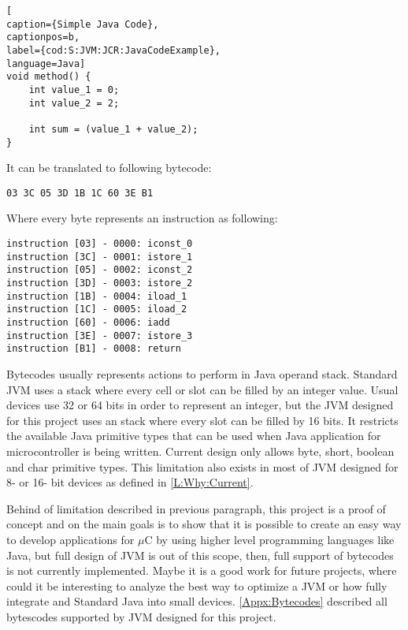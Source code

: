 \medskip
\begin{lstlisting}[
caption={Simple Java Code},
captionpos=b,
label={cod:S:JVM:JCR:JavaCodeExample},
language=Java]
void method() {
    int value_1 = 0;
    int value_2 = 2;

    int sum = (value_1 + value_2);
}
\end{lstlisting}
\medskip

It can be translated to following bytecode:

\medskip
\begin{lstlisting}
03 3C 05 3D 1B 1C 60 3E B1
\end{lstlisting}
\medskip

Where every byte represents an instruction as following:

\medskip
\begin{lstlisting}
instruction [03] - 0000: iconst_0
instruction [3C] - 0001: istore_1
instruction [05] - 0002: iconst_2
instruction [3D] - 0003: istore_2
instruction [1B] - 0004: iload_1
instruction [1C] - 0005: iload_2
instruction [60] - 0006: iadd
instruction [3E] - 0007: istore_3
instruction [B1] - 0008: return
\end{lstlisting}
\medskip

Bytecodes usually represents actions to perform in Java operand stack. Standard JVM uses a stack where every cell or slot can be filled by an integer value. Usual devices use 32 or 64 bits in order to represent an integer, but the JVM designed for this project uses an stack where every slot can be filled by 16 bits. It restricts the available Java primitive types that can be used when Java application for microcontroller is being written. Current design only allows byte, short, boolean and char primitive types. This limitation also exists in most of JVM designed for 8- or 16- bit devices as defined in \ref{L:Why:Current}.

Behind of limitation described in previous paragraph, this project is a proof of concept and on the main goals is to show that it is possible to create an easy way to develop applications for $\mu$C by using higher level programming languages like Java, but full design of JVM is out of this scope, then, full support of bytecodes is not currently implemented. Maybe it is a good work for future projects, where could it be interesting to analyze the best way to optimize a JVM or how fully integrate and Standard Java into small devices. \ref{Appx:Bytecodes} described all bytescodes supported by JVM designed for this project.

